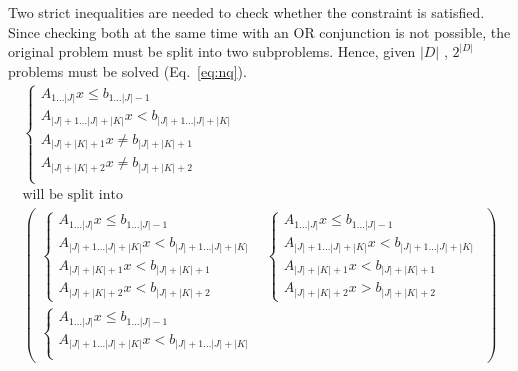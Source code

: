 \documentclass[runningheads]{llncs}
\begin{document}
Two strict inequalities are needed to check whether the constraint is satisfied.
Since checking both at the same time with an OR conjunction is not possible, the original problem must be split into two subproblems.
Hence, given $|D|$ \nqcs, $2^{|D|}$ problems must be solved (Eq.~\ref{eq:nq}).
\begin{equation}
    \label{eq:nq}
    \begin{gathered}
        \begin{cases}
            A_{1 \dots |J|} x \le b_{1 \dots |J| - 1}                 \\
            A_{|J| + 1\dots |J| + |K|} x < b_{|J| + 1\dots |J| + |K|} \\
            A_{|J| + |K| + 1} x \ne b_{|J| + |K| + 1}                 \\
            A_{|J| + |K| + 2} x \ne b_{|J| + |K| + 2}                 \\
        \end{cases}
        \\
        \text{will be split into}
        \\
        \begin{pmatrix}
            \begin{cases}
                A_{1 \dots |J|} x \le b_{1 \dots |J| - 1}                 \\
                A_{|J| + 1\dots |J| + |K|} x < b_{|J| + 1\dots |J| + |K|} \\
                A_{|J| + |K| + 1} x < b_{|J| + |K| + 1}                   \\
                A_{|J| + |K| + 2} x < b_{|J| + |K| + 2}
            \end{cases}
             &
            \begin{cases}
                A_{1 \dots |J|} x \le b_{1 \dots |J| - 1}                 \\
                A_{|J| + 1\dots |J| + |K|} x < b_{|J| + 1\dots |J| + |K|} \\
                A_{|J| + |K| + 1} x < b_{|J| + |K| + 1}                   \\
                A_{|J| + |K| + 2} x > b_{|J| + |K| + 2}
            \end{cases}
            \\
            \begin{cases}
                A_{1 \dots |J|} x \le b_{1 \dots |J| - 1}                 \\
                A_{|J| + 1\dots |J| + |K|} x < b_{|J| + 1\dots |J| + |K|} \\

\end{cases}
\end{pmatrix}
\end{gathered}
\end{equation}
\end{document}
